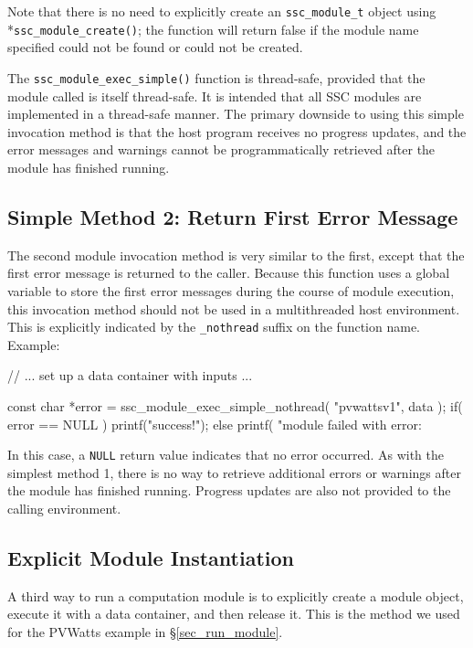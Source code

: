 \documentclass{scrartcl} %
\begin{document}
Note that there is no need to explicitly create an \texttt{ssc\_module\_t} object using \\*\texttt{ssc\_module\_create()}; the function will return false if the module name specified could not be found or could not be created.

The \texttt{ssc\_module\_exec\_simple()} function is thread-safe, provided that the module called is itself thread-safe.  It is intended that all SSC modules are implemented in a thread-safe manner.  The primary downside to using this simple invocation method is that the host program receives no progress updates, and the error messages and warnings cannot be programmatically retrieved after the module has finished running.

\subsection{Simple Method 2: Return First Error Message}
The second module invocation method is very similar to the first, except that the first error message is returned to the caller.  Because this function uses a global variable to store the first error messages during the course of module execution, this invocation method should not be used in a multithreaded host environment.  This is explicitly indicated by the \texttt{\_nothread} suffix on the function name.  Example:

\begin{verbatimtab}[4]
// ... set up a data container with inputs ...

const char *error = ssc_module_exec_simple_nothread( "pvwattsv1", data );
if( error == NULL )
	printf("success!\n");
else
	printf( "module failed with error: %
\end{verbatimtab}

In this case, a \texttt{NULL} return value indicates that no error occurred.  As with the simplest method 1, there is no way to retrieve additional errors or warnings after the module has finished running.  Progress updates are also not provided to the calling environment.

\subsection{Explicit Module Instantiation}
\label{sec_explicit_modules}

A third way to run a computation module is to explicitly create a module object, execute it with a data container, and then release it.  This is the method we used for the PVWatts example in \S\ref{sec_run_module}.
\end{document}
